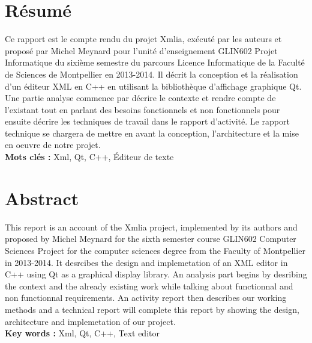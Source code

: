 \documentclass [a4 paper,11pt]{report}
\begin{document}
\section*{Résumé}
Ce rapport est le compte rendu du projet Xmlia, exécuté par les auteurs et proposé par Michel Meynard pour l’unité d’enseignement GLIN602 Projet Informatique du sixième semestre du parcours Licence Informatique de la Faculté de Sciences de Montpellier en 2013-2014. Il décrit la conception et la réalisation d'un éditeur XML en C++ en utilisant la bibliothèque d'affichage graphique Qt. Une partie analyse commence par décrire le contexte et rendre compte de l'existant tout en parlant des besoins fonctionnels et non fonctionnels pour ensuite décrire les techniques de travail dans le rapport d'activité. Le rapport technique se chargera de mettre en avant la conception, l'architecture et la mise en oeuvre de notre projet. \\

\textbf{Mots clés : } Xml, Qt, C++, Éditeur de texte

\section*{Abstract}
This report is an account of the Xmlia project, implemented by its authors and proposed by Michel Meynard for the sixth semester course GLIN602 Computer Sciences Project for the computer sciences degree from the Faculty of Montpellier in 2013-2014. It desrcibes the design and implemetation of an XML editor in C++ using Qt as a graphical display library. An analysis part begins by desribing the context and the already existing work while talking about functionnal and non functionnal requirements. An activity report then describes our working methods and a technical report will complete this report by showing the design, architecture and implemetation of our project. \\

\textbf{Key words : } Xml, Qt, C++, Text editor
%
\end{document}
